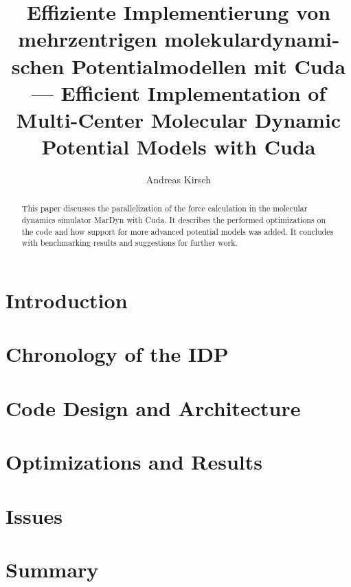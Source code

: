 \documentclass[11pt,a4paper,onecolumn,notitlepage]{scrartcl}
\author{Andreas Kirsch}
\title{\foreignlanguage{ngerman}{Effiziente Implementierung von mehrzentrigen molekulardynamischen Potentialmodellen mit Cuda} \linebreak --- \linebreak Efficient Implementation of Multi-Center Molecular Dynamic Potential Models with Cuda}
\newcommand{\cuda}{Cuda}
\begin{document}
\maketitle

\begin{abstract}
This paper discusses the parallelization of the force calculation in the molecular dynamics simulator MarDyn with \cuda. It describes the performed optimizations on the code and how support for more advanced potential models was added. It concludes with benchmarking results and suggestions for further work.
\end{abstract}

\section{Introduction}



\section{Chronology of the IDP}



\section{Code Design and Architecture}



\section{Optimizations and Results}

\section{Issues}

\section{Summary}
\end{document}
